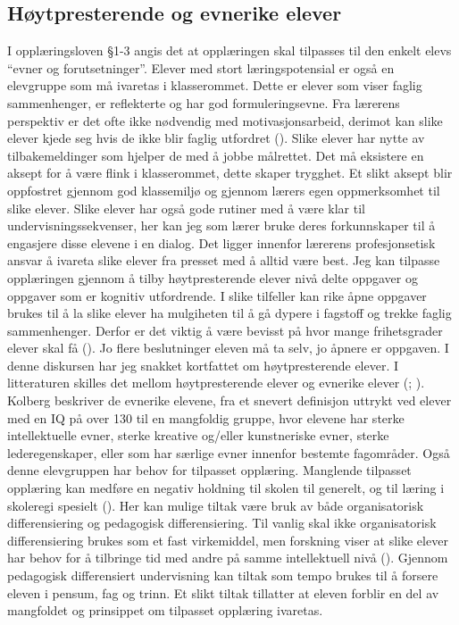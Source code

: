 \documentclass[main.tex]{subfiles}
\begin{document}
\subsection*{Høytpresterende og evnerike elever}

I opplæringsloven \S 1-3 angis det at opplæringen skal tilpasses til den enkelt elevs ``evner og forutsetninger''.  Elever med stort læringspotensial er også en elevgruppe som må ivaretas i klasserommet. Dette er elever som viser faglig sammenhenger, er reflekterte og har god formuleringsevne. Fra lærerens perspektiv er det ofte ikke nødvendig med motivasjonsarbeid, derimot kan slike elever kjede seg hvis de ikke blir faglig utfordret (). Slike elever har nytte av tilbakemeldinger som hjelper de med å jobbe målrettet. Det må eksistere en aksept for å være flink i klasserommet, dette skaper trygghet. Et slikt aksept blir oppfostret gjennom god klassemiljø og gjennom lærers egen oppmerksomhet til slike elever. Slike elever har også gode rutiner med å være klar til undervisningssekvenser, her kan jeg som lærer bruke deres forkunnskaper til å engasjere disse elevene i en dialog. Det ligger innenfor lærerens profesjonsetisk ansvar å ivareta slike elever fra presset med å alltid være best. 
\newline\newline
Jeg kan tilpasse opplæringen gjennom å tilby høytpresterende elever nivå delte oppgaver og oppgaver som er kognitiv utfordrende. I slike tilfeller kan rike åpne oppgaver brukes til å la slike elever ha mulgiheten til å gå dypere i fagstoff og trekke faglig sammenhenger.  Derfor er det viktig å være bevisst på hvor mange frihetsgrader elever skal få (). Jo flere beslutninger eleven må ta selv, jo åpnere er oppgaven.
\newline\newline 
I denne diskursen har jeg snakket kortfattet om høytpresterende elever. I litteraturen skilles det mellom høytpresterende elever og evnerike elever (; ). Kolberg beskriver de evnerike elevene, fra et snevert definisjon uttrykt ved elever med en IQ på over 130 til en mangfoldig gruppe, hvor elevene har sterke intellektuelle evner, sterke kreative og/eller kunstneriske evner, sterke lederegenskaper, eller som har særlige evner innenfor bestemte fagområder. Også denne elevgruppen har behov for tilpasset opplæring. Manglende tilpasset opplæring kan medføre en negativ holdning til skolen til generelt, og til læring i skoleregi spesielt (). Her kan mulige tiltak være bruk av både organisatorisk differensiering og pedagogisk differensiering. Til vanlig skal ikke organisatorisk differensiering brukes som et fast virkemiddel, men forskning viser at slike elever har behov for å tilbringe tid med andre på samme intellektuell nivå (). Gjennom pedagogisk differensiert undervisning kan tiltak som tempo brukes til å forsere eleven i pensum, fag og trinn. Et slikt tiltak tillatter at eleven forblir en del av mangfoldet og prinsippet om tilpasset opplæring ivaretas.
\end{document}
